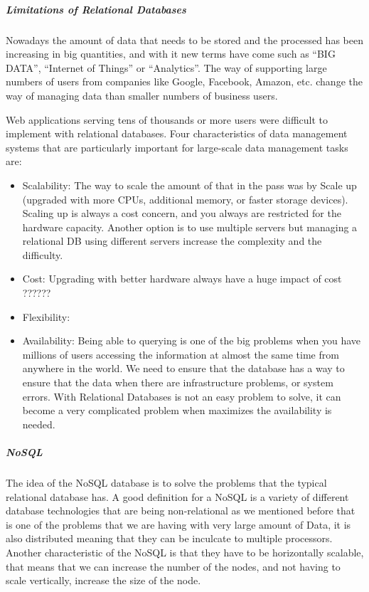 \documentclass[]{article}
\let\oldsubparagraph\subparagraph
\renewcommand{\subparagraph}[1]{\oldsubparagraph{#1}\mbox{}}
\begin{document}
\hypertarget{limitations-of-relational-databases}{%
\subparagraph{Limitations of Relational
Databases}\label{limitations-of-relational-databases}}

Nowadays the amount of data that needs to be stored and the processed
has been increasing in big quantities, and with it new terms have come
such as ``BIG DATA'', ``Internet of Things'' or ``Analytics''. The way
of supporting large numbers of users from companies like Google,
Facebook, Amazon, etc. change the way of managing data than smaller
numbers of business users.

Web applications serving tens of thousands or more users were difficult
to implement with relational databases. Four characteristics of data
management systems that are particularly important for large-scale data
management tasks are:

\begin{itemize}
\item
  Scalability: The way to scale the amount of that in the pass was by
  Scale up (upgraded with more CPUs, additional memory, or faster
  storage devices). Scaling up is always a cost concern, and you always
  are restricted for the hardware capacity. Another option is to use
  multiple servers but managing a relational DB using different servers
  increase the complexity and the difficulty.
\item
  Cost: Upgrading with better hardware always have a huge impact of cost
  ??????
\item
  Flexibility:
\item
  Availability: Being able to querying is one of the big problems when
  you have millions of users accessing the information at almost the
  same time from anywhere in the world. We need to ensure that the
  database has a way to ensure that the data when there are
  infrastructure problems, or system errors. With Relational Databases
  is not an easy problem to solve, it can become a very complicated
  problem when maximizes the availability is needed.
\end{itemize}

\hypertarget{nosql}{%
\subparagraph{NoSQL}\label{nosql}}

The idea of the NoSQL database is to solve the problems that the typical
relational database has. A good definition for a NoSQL is a variety of
different database technologies that are being non-relational as we
mentioned before that is one of the problems that we are having with
very large amount of Data, it is also distributed meaning that they can
be inculcate to multiple processors. Another characteristic of the NoSQL
is that they have to be horizontally scalable, that means that we can
increase the number of the nodes, and not having to scale vertically,
increase the size of the node.
\end{document}
